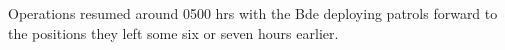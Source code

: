 \documentclass[noraggedright]{turabian-researchpaper}
\begin{document}
Operations resumed around 0500 hrs with the Bde deploying patrols forward to 
the positions they left some six or seven hours earlier.\autocite[9 July 1944]
{1318wd}  









\end{document}
